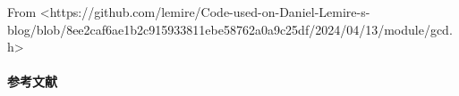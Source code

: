 From <https://github.com/lemire/Code-used-on-Daniel-Lemire-s-blog/blob/8ee2caf6ae1b2c915933811ebe58762a0a9c25df/2024/04/13/module/gcd.h>

\paragraph{参考文献} \cite{menezes2018handbook}
